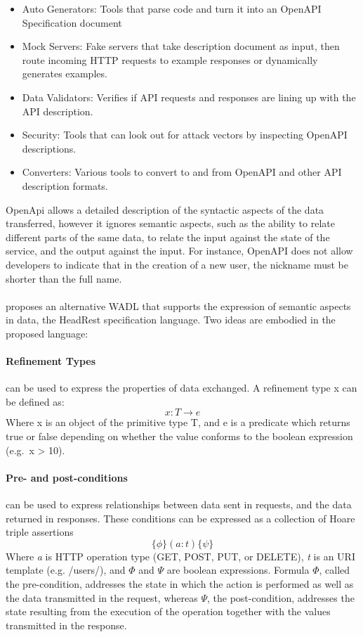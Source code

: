 \begin{itemize}
    \setlength\itemsep{0em}
    \item Auto Generators: Tools that parse code and turn it into an OpenAPI Specification document
    \item Mock Servers: Fake servers that take description document as input, then route incoming HTTP requests to example responses or dynamically generates examples.
    \item Data Validators: Verifies if API requests and responses are lining up with the API description.
    \item Security: Tools that can look out for attack vectors by inspecting OpenAPI descriptions.
    \item Converters: Various tools to convert to and from OpenAPI and other API description formats.
\end{itemize}

OpenApi allows a detailed description of the syntactic aspects of the data transferred, however it ignores semantic aspects, such as the ability to relate
different parts of the same data, to relate the input against the state of the service, and the output against the input.
For instance, OpenAPI does not allow developers to indicate that in the creation of a new user, the nickname must be shorter
than the full name.

\paragraph{}

\citeauthor{headRest} \cite{headRest} proposes an alternative WADL that supports the expression of semantic aspects in data, the HeadRest specification language.
Two ideas are embodied in the proposed language:

\paragraph{Refinement Types} \cite{freeman1991refinement} can be used to express the properties of data exchanged.
A refinement type x can be defined as:
\[ x:T \rightarrow e \]
Where x is an object of the primitive type T, and e is a predicate which returns true or false depending on whether the value conforms to the boolean expression (e.g.\ x > 10).

\paragraph{Pre- and post-conditions} can be used to express relationships between data sent in
requests, and the data returned in responses. These conditions can be expressed as a collection of Hoare triple assertions
\[ \{\phi\} (a : t) \{\psi\} \]
Where \emph{a} is HTTP operation type (GET, POST, PUT, or DELETE), \emph{t} is an URI template (e.g. /users/), and $\Phi$ and $\Psi$ are boolean expressions.
Formula $\Phi$, called the pre-condition, addresses the state in which the action is performed as well as the data transmitted in the request,
whereas $\Psi$, the post-condition, addresses the state resulting from the execution of the operation together with the values transmitted in the response.

